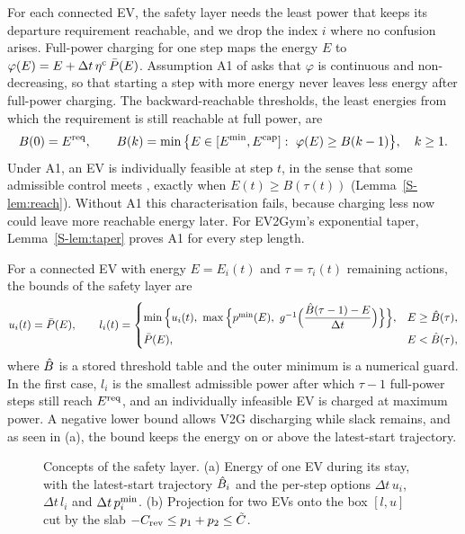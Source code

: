 For each connected EV, the safety layer needs the least power that keeps its departure requirement reachable, and we drop the index $i$ where no confusion arises.
Full-power charging for one step maps the energy $E$ to $\varphi(E)=E+\Delta t\,\eta^{\mathrm c}\,\bar P(E)$.
Assumption A1 of  asks that $\varphi$ is continuous and non-decreasing, so that starting a step with more energy never leaves less energy after full-power charging.
The backward-reachable thresholds, the least energies from which the requirement is still reachable at full power, are
\begin{equation}\label{eq:thresholds}
B(0)=\Ereq,\qquad B(k)=\min\big\{E\in[E^{\min},E^{\sm{cap}}]:\ \varphi(E)\ge B(k-1)\big\},\quad k\ge1 .
\end{equation}
Under A1, an EV is individually feasible at step $t$, in the sense that some admissible control meets , exactly when $E(t)\ge B(\tau(t))$ (Lemma~\ref{S-lem:reach}).
Without A1 this characterisation fails, because charging less now could leave more reachable energy later.
For EV2Gym's exponential taper, Lemma~\ref{S-lem:taper} proves A1 for every step length.

For a connected EV with energy $E=E_i(t)$ and $\tau=\tau_i(t)$ remaining actions, the bounds of the safety layer are
\begin{equation}\label{eq:bounds}
u_i(t)=\bar P(E),\qquad
l_i(t)=\begin{cases}
\min\Big\{u_i(t),\ \max\Big\{\pmn(E),\ g^{-1}\Big(\dfrac{\Bh(\tau-1)-E}{\Delta t}\Big)\Big\}\Big\}, & E\ge\Bh(\tau),\\[2mm]
\bar P(E), & E<\Bh(\tau),
\end{cases}
\end{equation}
where $\hat B$ is a stored threshold table and the outer minimum is a numerical guard.
In the first case, $l_i$ is the smallest admissible power after which $\tau-1$ full-power steps still reach $E^{\mathrm{req}}$, and an individually infeasible EV is charged at maximum power.
A negative lower bound allows V2G discharging while slack remains, and as seen in (a), the bound keeps the energy on or above the latest-start trajectory.

\begin{figure}[t]
\centering
{}
\caption{Concepts of the safety layer. (a) Energy of one EV during its stay, with the latest-start trajectory $\hat B_i$ and the per-step options $\Delta t\,u_i$, $\Delta t\,l_i$ and $\Delta t\,p^{\min}_i$. (b) Projection for two EVs onto the box $[l,u]$ cut by the slab $-C_{\mathrm{rev}}\le p_1+p_2\le\tilde C$.}
\label{fig:concepts}
\end{figure}

